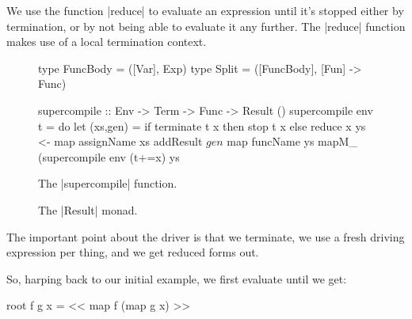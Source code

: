 \documentclass{sigplanconf}
\begin{document}
We use the function |reduce| to evaluate an expression until it's stopped either by termination, or by not being able to evaluate it any further. The |reduce| function makes use of a local termination context.

\begin{figure}
\begin{code}
type FuncBody = ([Var], Exp)
type Split = ([FuncBody], [Fun] -> Func)

supercompile :: Env -> Term -> Func -> Result ()
supercompile env t = do
    let (xs,gen) = if terminate t x then stop t x else reduce x
    ys <- map assignName xs
    addResult $ gen $ map funcName ys
    mapM_ (supercompile env (t+=x) ys
\end{code}
\caption{The |supercompile| function.}
\label{fig:supercompile}
\end{figure}

\begin{figure}
\caption{The |Result| monad.}
\label{fig:result}
\end{figure}


The important point about the driver is that we terminate, we use a fresh driving expression per thing, and we get reduced forms out.

So, harping back to our initial example, we first evaluate until we get:

\begin{code}
root f g x = << map f (map g x) >>
\end{code}
\end{document}

